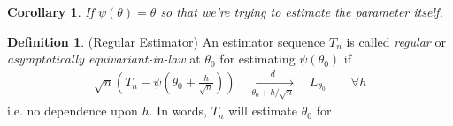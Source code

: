 \documentclass[12pt]{article}
\theoremstyle{plain}
\newtheorem{cor}[thm]{Corollary}
\theoremstyle{definition}
\newtheorem{defn}[thm]{Definition}
\theoremstyle{remark}
\newcommand{\dto}{\xrightarrow{d}}
\begin{document}
\begin{cor}
If $\psi(\theta)=\theta$ so that we're trying to estimate the parameter
itself,
\end{cor}


\begin{defn}(Regular Estimator)
An estimator sequence $T_n$ is called \emph{regular} or
\emph{asymptotically equivariant-in-law} at $\theta_0$ for
estimating $\psi(\theta_0)$ if
\begin{align*}
  \sqrt{n}
  \left(
  T_n
  -
  \psi\left(
  \theta_0 + \frac{h}{\sqrt{n}}
  \right)
  \right)
  \quad\underset{\theta_0+h/\sqrt{n}}{\dto}\quad
  L_{\theta_0}
  \qquad
  \forall h
\end{align*}
i.e. no dependence upon $h$.
In words, $T_n$ will estimate $\theta_0$ for 
\end{defn}





\end{document}
